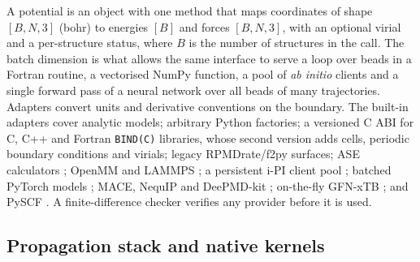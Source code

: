 \documentclass[preprint,12pt]{elsarticle}
\newcommand{\code}[1]{\texttt{#1}}
\begin{document}
A potential is an object with one method that maps coordinates of shape $[B,N,3]$ (bohr) to energies $[B]$ and forces $[B,N,3]$, with an optional virial and a per-structure status, where $B$ is the number of structures in the call. The batch dimension is what allows the same interface to serve a loop over beads in a Fortran routine, a vectorised NumPy function, a pool of \emph{ab initio} clients and a single forward pass of a neural network over all beads of many trajectories. Adapters convert units and derivative conventions on the boundary. The built-in adapters cover analytic models; arbitrary Python factories; a versioned C ABI for C, C++ and Fortran \code{BIND(C)} libraries, whose second version adds cells, periodic boundary conditions and virials; legacy RPMDrate/f2py surfaces; ASE calculators \cite{ase2017}; OpenMM \cite{openmm2017} and LAMMPS \cite{lammps1995}; a persistent i-PI client pool \cite{ipi2014}; batched PyTorch models \cite{torch2019}; MACE, NequIP and DeePMD-kit \cite{mace2022,nequip2022,deepmd2018}; on-the-fly GFN-xTB \cite{gfn22019}; and PySCF \cite{pyscf2018}. A finite-difference checker verifies any provider before it is used.

\subsection{Propagation stack and native kernels}
\label{sec:native}
\end{document}

